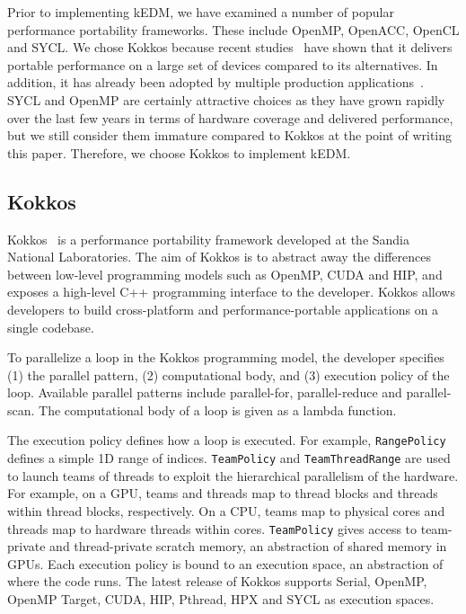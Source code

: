 \documentclass[sigconf]{acmart}
\begin{document}
Prior to implementing kEDM, we have examined a number of popular performance
portability frameworks. These include OpenMP, OpenACC, OpenCL and SYCL\@. We
chose Kokkos  because recent studies~\cite{Martineau2017, Deakin2019, Deakin2020}
have shown that it delivers portable performance on a large set of devices
compared to its alternatives. In addition, it has already been adopted by
multiple production applications~\cite{Sprague2020,Holmen2017,Demeshko2019}.
SYCL and OpenMP are certainly attractive choices as they have grown rapidly over the
last few years in terms of hardware coverage and delivered performance, but we
still consider them immature compared to Kokkos at the point of writing this
paper. Therefore, we choose Kokkos to implement kEDM\@.

\subsection{Kokkos}

Kokkos~\cite{Edwards2014} is a performance portability framework developed at
the Sandia National Laboratories. The aim of Kokkos is to abstract away the
differences between low-level programming models such as OpenMP, CUDA and HIP,
and exposes a high-level C++ programming interface to the developer. Kokkos allows
developers to build cross-platform and performance-portable applications on a
single codebase.

To parallelize a loop in the Kokkos programming model, the developer specifies (1)
the parallel pattern, (2) computational body, and (3) execution policy of the
loop. Available parallel patterns include parallel-for, parallel-reduce and
parallel-scan. The computational body of a loop is given as a lambda function.

The execution policy defines how a loop is executed. For example,
\texttt{RangePolicy} defines a simple 1D range of indices. \texttt{TeamPolicy}
and \texttt{TeamThreadRange} are used to launch teams of threads to exploit
the hierarchical parallelism of the hardware. For example, on a GPU, teams and threads map
to thread blocks and threads within thread blocks, respectively. On a CPU,
teams map to physical cores and threads map to hardware threads within cores.
\texttt{TeamPolicy} gives access to team-private and thread-private scratch
memory, an abstraction of shared memory in GPUs. Each execution policy is
bound to an execution space, an abstraction of where the code runs. The latest
release of Kokkos supports Serial, OpenMP, OpenMP Target, CUDA, HIP, Pthread,
HPX and SYCL as execution spaces.
\end{document}
